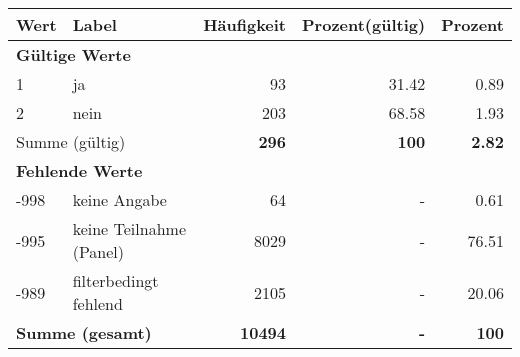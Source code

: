      \begin{longtable}{lXrrr}
     \toprule
     \textbf{Wert} & \textbf{Label} & \textbf{Häufigkeit} & \textbf{Prozent(gültig)} & \textbf{Prozent} \\
     \endhead
     \midrule
     \multicolumn{5}{l}{\textbf{Gültige Werte}}\\

     1 &
     \multicolumn{1}{X}{ ja   } &


       \num{93} &
       \num[round-mode=places,round-precision=2]{31,42} &
         \num[round-mode=places,round-precision=2]{0,89} \\

     2 &
     \multicolumn{1}{X}{ nein   } &


       \num{203} &
       \num[round-mode=places,round-precision=2]{68,58} &
         \num[round-mode=places,round-precision=2]{1,93} \\
     \midrule
     \multicolumn{2}{l}{Summe (gültig)} &
       \textbf{\num{296}} &
     \textbf{100} &
       \textbf{\num[round-mode=places,round-precision=2]{2,82}} \\
     \multicolumn{5}{l}{\textbf{Fehlende Werte}}\\
       -998 &
       keine Angabe &
         \num{64} &
        - &
         \num[round-mode=places,round-precision=2]{0,61} \\
       -995 &
       keine Teilnahme (Panel) &
         \num{8029} &
        - &
         \num[round-mode=places,round-precision=2]{76,51} \\
       -989 &
       filterbedingt fehlend &
         \num{2105} &
        - &
         \num[round-mode=places,round-precision=2]{20,06} \\
     \midrule
     \multicolumn{2}{l}{\textbf{Summe (gesamt)}} &
          \textbf{\num{10494}} &
        \textbf{-} &
        \textbf{100} \\
     \bottomrule
     \end{longtable}
     
